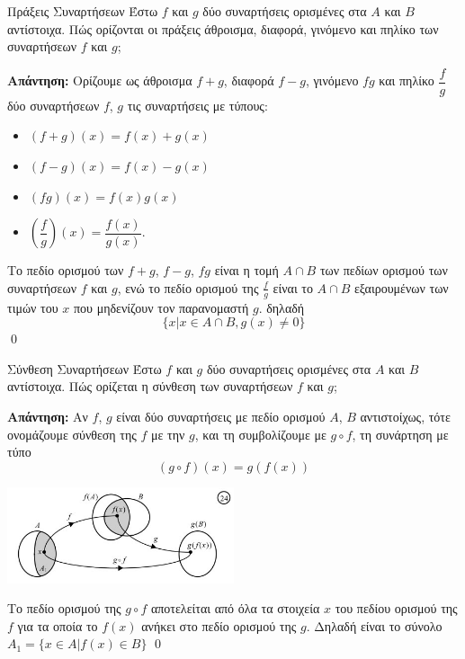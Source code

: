 \documentclass[a4paper, 12pt]{article}
\renewenvironment{proof}[1][\textbf{Απάντηση}]{%
  \par\noindent\textbf{#1:} \rmfamily}{\qed\par}
\begin{document}
\begin{theorem}{Πράξεις Συναρτήσεων}
  Έστω $f$ και $g$ δύο συναρτήσεις ορισμένες στα $Α$ και $Β$ αντίστοιχα. Πώς ορίζονται οι πράξεις άθροισμα, διαφορά, γινόμενο και πηλίκο των συναρτήσεων $f$ και $g$;
\end{theorem}
\begin{proof}
  Ορίζουμε ως άθροισμα $f + g$,  διαφορά $f - g$,  γινόμενο $fg$  και  πηλίκο $\dfrac{f}{g}$ δύο συναρτήσεων $f$, $g$ τις συναρτήσεις με τύπους:
  \begin{itemize}
    \item $(f + g)(x) = f(x) + g(x)$
    \item $(f - g)(x) = f(x) - g(x)$
    \item $(fg)(x) = f(x)g(x)$
    \item $\left(\dfrac{f}{g}\right)(x) = \dfrac{f(x)}{g(x)}$.
  \end{itemize}
  Το πεδίο ορισμού των $f+g$, $f-g$, $fg$ είναι η τομή $A \cap B$ των πεδίων ορισμού των συναρτήσεων $f$ και $g$, ενώ το πεδίο ορισμού της $\frac{f}{g}$ είναι το $A \cap B$ εξαιρουμένων των τιμών του $x$ που μηδενίζουν τον παρανομαστή $g$. δηλαδή
  $$ \{ x|x\in A \cap B, g(x) \neq 0 \}$$
\end{proof}

\begin{theorem}{Σύνθεση Συναρτήσεων}
  Έστω $f$ και $g$ δύο συναρτήσεις ορισμένες στα $A$ και $B$ αντίστοιχα. Πώς ορίζεται η σύνθεση των συναρτήσεων $f$ και $g$;
\end{theorem}
\begin{proof}
  Αν $f$, $g$ είναι δύο συναρτήσεις με πεδίο ορισμού $Α$, $Β$ αντιστοίχως, τότε ονομάζουμε σύνθεση της $f$ με την $g$, και τη συμβολίζουμε με $g\circ f$, τη συνάρτηση με τύπο
  $$(g\circ f)(x) = g(f(x))$$
  \begin{center}
    \includegraphics[width=0.5\textwidth]{images/1.2 Σύνθεση}
  \end{center}
  Το πεδίο ορισμού της $g\circ f$ αποτελείται από όλα τα στοιχεία $x$ του πεδίου ορισμού της $f$ για τα οποία το $f(x)$ ανήκει στο πεδίο ορισμού της $g$. Δηλαδή είναι το σύνολο
  $A_1 = \{ x \in A   |   f(x) \in Β\}$
\end{proof}
\end{document}

